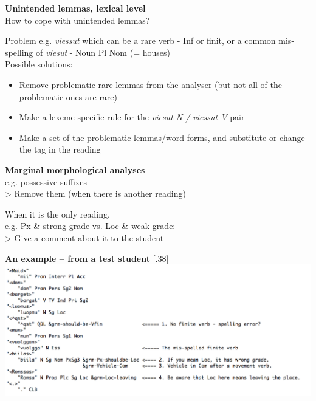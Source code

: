 \documentclass[landscape,norsk,11pt]{seminar}
\begin{document}
\begin{slide}
\newslide
\textbf{Unintended lemmas, lexical level} \\
How to cope with unintended lemmas?

Problem e.g. \textit{viessut} which can be a rare verb - Inf or finit,  or  a common mis-spelling of   \textit{viesut} - Noun Pl Nom (= houses) \\
Possible solutions:

\begin{itemize}
\item{Remove problematic rare lemmas from the analyser (but not all of the problematic ones are rare)}
\item{Make a lexeme-specific rule for the \textit{viesut  N / viessut V } pair}
\item{Make a set of the problematic lemmas/word forms, and substitute or change the tag in the reading}
\end{itemize}


\newslide
\textbf{Marginal morphological analyses} \\
e.g. possessive suffixes \\
> Remove them (when there is another reading)

When it is the only reading, \\ e.g. Px \& strong grade vs. Loc \& weak grade: \\
> Give a comment about it to the student







\newslide
\textbf{An example -- from a test student}
\scalebox{.32}[.38]{\includegraphics{img/sentence_example.png}}


\end{slide}
\end{document}
